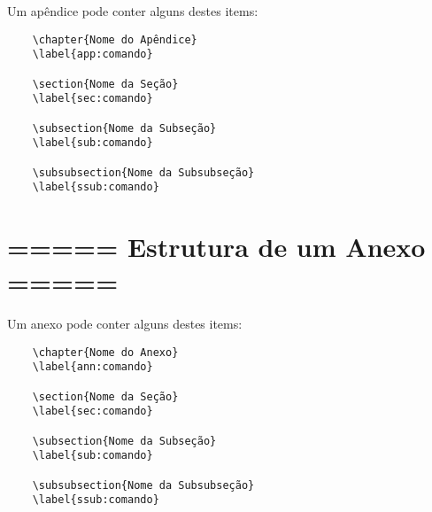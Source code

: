 Um apêndice pode conter alguns destes items:

\begin{verbatim}
    \chapter{Nome do Apêndice}
    \label{app:comando}

    \section{Nome da Seção}
    \label{sec:comando}

    \subsection{Nome da Subseção}
    \label{sub:comando}

    \subsubsection{Nome da Subsubseção}
    \label{ssub:comando}
\end{verbatim}


\section{===== Estrutura de um Anexo =====}

Um anexo pode conter alguns destes items:

\begin{verbatim}
    \chapter{Nome do Anexo}
    \label{ann:comando}

    \section{Nome da Seção}
    \label{sec:comando}

    \subsection{Nome da Subseção}
    \label{sub:comando}

    \subsubsection{Nome da Subsubseção}
    \label{ssub:comando}
\end{verbatim}


